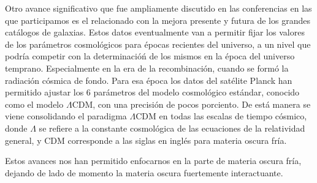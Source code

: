 Otro avance significativo que fue ampliamente discutido en las conferencias en las que participamos
es el relacionado con la mejora presente y futura de
los grandes catálogos de galaxias. Estos datos eventualmente van a permitir
fijar los valores  de los parámetros cosmológicos para épocas recientes del universo, a un nivel
que podría  competir con la determinacióń de los mismos en la época del universo temprano. Especialmente en la era de la
recombinación, cuando se formó la radiación cósmica de fondo. Para esa época los datos del satélite Planck han permitido ajustar los 6 parámetros  del modelo cosmológico estándar, conocido como el modelo $\Lambda$CDM, con una precisión de pocos porciento.
De está
manera se viene consolidando el paradigma $\Lambda$CDM en todas las escalas de tiempo cósmico, donde $\Lambda$ se refiere a la
constante cosmológica de las ecuaciones de la relatividad general, y
CDM corresponde a las siglas en inglés para materia oscura fría.




Estos avances nos han permitido enfocarnos en la parte de materia
oscura fría, dejando de lado de momento la materia oscura fuertemente
interactuante.

